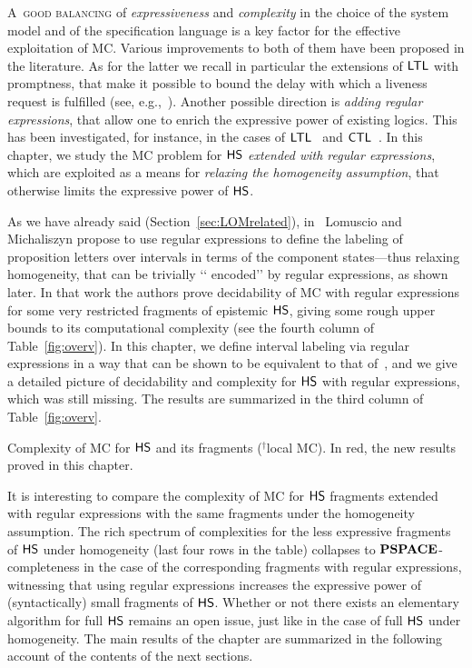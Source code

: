 \lettrine[lines=3]{A}{\ good balancing} of \emph{expressiveness} and \emph{complexity} in the choice 
of the system 
model and of the specification language is a key factor for the effective 
exploitation of MC. 
Various improvements to both of them have been proposed in the literature. As 
for the latter we recall in particular the extensions of $\text{\sffamily LTL}$ with 
promptness, that make it 
possible to bound the delay with which a liveness request is fulfilled (see, 
e.g.,~\cite{DBLP:journals/fmsd/KupfermanPV09}). 
Another possible direction is
\emph{adding regular expressions}, that allow one to enrich the expressive 
power of existing logics. This has been investigated, for instance, in the 
cases of $\text{\sffamily LTL}$~\cite{Leucker2007} and $\text{\sffamily CTL}$~\cite{MATEESCU20112854}.
%
In this chapter, we study the MC problem for \emph{$\text{\sffamily HS}$ extended with regular 
expressions}, which are exploited as a means for \emph{relaxing the homogeneity 
assumption}, that otherwise limits the expressive power of $\text{\sffamily HS}$. 

As we have already said (Section~\ref{sec:LOMrelated}), in~\cite{lm16} %
Lomuscio and Michaliszyn propose to use regular expressions to define the 
labeling of proposition letters over intervals in terms of the component 
states---thus relaxing homogeneity, that can be trivially \lq\lq 
encoded\rq\rq{} by regular expressions, as shown later. In that work the 
authors prove decidability of MC with regular expressions for some very 
restricted fragments of epistemic $\text{\sffamily HS}$, giving some rough upper bounds to its 
computational complexity
(see the fourth column of Table~\ref{fig:overv}).
%
In this chapter, 
we define interval labeling via regular expressions in a way that 
can be shown to be equivalent to that of~\cite{lm16}, and
we give a detailed picture of decidability and complexity for $\text{\sffamily HS}$ with 
regular expressions, which was still missing. The results are summarized in the 
third column of Table~\ref{fig:overv}. 

\begin{table}
	\centering
	\caption{Complexity of MC for $\text{\sffamily HS}$ and its fragments ($^\dagger$local MC). 
	In red, the new results proved in this chapter.}\label{fig:overv}
	\resizebox{\textwidth}{!}{
		
	}
\end{table}

It is interesting to compare the complexity of MC for $\text{\sffamily HS}$ fragments extended with regular expressions with the same fragments under the homogeneity assumption. The rich spectrum of complexities for the less expressive fragments of $\text{\sffamily HS}$ under homogeneity (last four rows in the table) collapses to $\textbf{PSPACE}$-completeness in the case of the corresponding fragments with regular expressions, witnessing that using regular expressions increases the expressive power of (syntactically) small fragments of $\text{\sffamily HS}$. Whether or not there exists an elementary algorithm for full $\text{\sffamily HS}$ remains an open issue, just like in the case of full $\text{\sffamily HS}$ under homogeneity. The main results of the chapter are summarized in the following account of the contents of the next sections.

